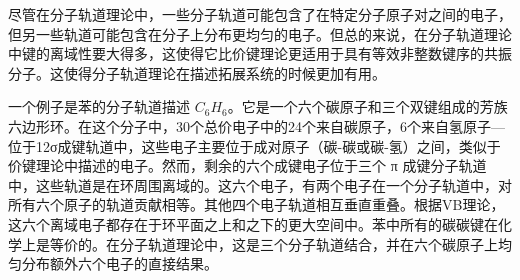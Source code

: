尽管在分子轨道理论中，一些分子轨道可能包含了在特定分子原子对之间的电子，但另一些轨道可能包含在分子上分布更均匀的电子。但总的来说，在分子轨道理论中键的离域性要大得多，这使得它比价键理论更适用于具有等效非整数键序的共振分子。这使得分子轨道理论在描述拓展系统的时候更加有用。

一个例子是苯的分子轨道描述 $C_6H_6$。它是一个六个碳原子和三个双键组成的芳族六边形环。在这个分子中，30个总价电子中的24个来自碳原子，6个来自氢原子—位于12σ成键轨道中，这些电子主要位于成对原子（碳-碳或碳-氢）之间，类似于价键理论中描述的电子。然而，剩余的六个成键电子位于三个 π 成键分子轨道中，这些轨道是在环周围离域的。这六个电子，有两个电子在一个分子轨道中，对所有六个原子的轨道贡献相等。其他四个电子轨道相互垂直重叠。根据VB理论，这六个离域电子都存在于环平面之上和之下的更大空间中。苯中所有的碳碳键在化学上是等价的。在分子轨道理论中，这是三个分子轨道结合，并在六个碳原子上均匀分布额外六个电子的直接结果。
